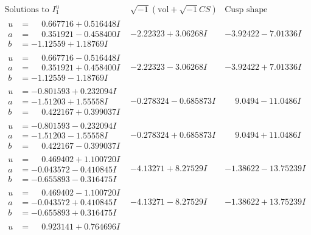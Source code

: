 \documentclass[1p]{elsarticle_modified}
\theoremstyle{definition}
\newcommand{\I}{\sqrt{-1}}
\begin{document}
$$\begin{array}{c|c|c}  
\text{Solutions to }I^u_{1}& \I (\text{vol} + \sqrt{-1}CS) & \text{Cusp shape}\\
 \hline 
\begin{aligned}
u &= \phantom{-}0.667716 + 0.516448 I \\
a &= \phantom{-}0.351921 - 0.458400 I \\
b &= -1.12559 + 1.18769 I\end{aligned}
 & -2.22323 + 3.06268 I & -3.92422 - 7.01336 I \\ \hline\begin{aligned}
u &= \phantom{-}0.667716 - 0.516448 I \\
a &= \phantom{-}0.351921 + 0.458400 I \\
b &= -1.12559 - 1.18769 I\end{aligned}
 & -2.22323 - 3.06268 I & -3.92422 + 7.01336 I \\ \hline\begin{aligned}
u &= -0.801593 + 0.232094 I \\
a &= -1.51203 + 1.55558 I \\
b &= \phantom{-}0.422167 + 0.399037 I\end{aligned}
 & -0.278324 - 0.685873 I & \phantom{-}9.0494 - 11.0486 I \\ \hline\begin{aligned}
u &= -0.801593 - 0.232094 I \\
a &= -1.51203 - 1.55558 I \\
b &= \phantom{-}0.422167 - 0.399037 I\end{aligned}
 & -0.278324 + 0.685873 I & \phantom{-}9.0494 + 11.0486 I \\ \hline\begin{aligned}
u &= \phantom{-}0.469402 + 1.100720 I \\
a &= -0.043572 - 0.410845 I \\
b &= -0.655893 - 0.316475 I\end{aligned}
 & -4.13271 + 8.27529 I & -1.38622 - 13.75239 I \\ \hline\begin{aligned}
u &= \phantom{-}0.469402 - 1.100720 I \\
a &= -0.043572 + 0.410845 I \\
b &= -0.655893 + 0.316475 I\end{aligned}
 & -4.13271 - 8.27529 I & -1.38622 + 13.75239 I \\ \hline\begin{aligned}
u &= \phantom{-}0.923141 + 0.764696 I \\

\end{aligned}
\end{array}$$
\end{document}
